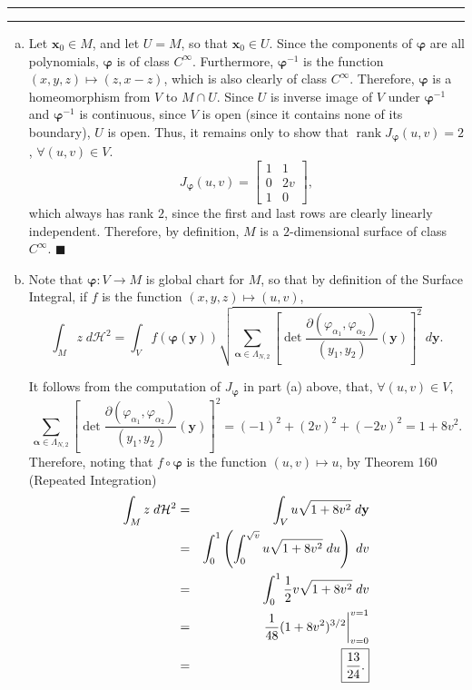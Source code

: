 \documentclass[11pt]{article}
\newcounter{questionCounter}
\newcounter{partCounter}[questionCounter]
\newenvironment{question}[2][\arabic{questionCounter}]{%
    \setcounter{partCounter}{0}%
    \vspace{.25in} \hrule \vspace{0.5em}%
        \noindent{\bf #2}%
    \vspace{0.8em} \hrule \vspace{.10in}%
    \addtocounter{questionCounter}{1}%
}{}
\renewcommand{\qed}{\quad $\blacksquare$}
\newcommand{\bvarphi}{\boldsymbol{\varphi}}
\newcommand{\balpha}{\boldsymbol{\alpha}}
\newcommand{\rank}{\operatorname{rank}}
\newcommand{\bx}{\mathbf{x}}
\newcommand{\by}{\mathbf{y}}
\begin{document}
\begin{question}{Problem 3}
\begin{enumerate}[(a)]
\item Let $\bx_0 \in M$, and let $U = M$, so that $\bx_0 \in U$.
Since the components of $\bvarphi$ are all polynomials, $\bvarphi$ is of class
$C^{\infty}$. Furthermore, $\bvarphi^{-1}$ is the function
$(x,y,z) \mapsto (z,x - z)$, which is also clearly of class $C^{\infty}$.
Therefore, $\bvarphi$ is a homeomorphism from $V$ to $M \cap U$. Since $U$ is
inverse image of $V$ under $\bvarphi^{-1}$ and $\bvarphi^{-1}$ is continuous,
since $V$ is open (since it contains none of its boundary), $U$ is open. Thus,
it remains only to show that $\rank J_{\bvarphi}(u,v) = 2$,
$\forall (u,v) \in V$.
\[J_{\bvarphi}(u,v) =
  \begin{bmatrix}
    1 & 1  \\
    0 & 2v \\
    1 & 0
  \end{bmatrix}
,\]
which always has rank $2$, since the first and last rows are clearly linearly
independent. Therefore, by definition, $M$ is a $2$-dimensional surface of
class $C^{\infty}$. \qed

\item Note that $\bvarphi:V \rightarrow M$ is global chart for $M$, so that by
definition of the Surface Integral, if $f$ is the function
$(x,y,z) \mapsto (u,v)$,
\[\int_M z \; d\mathcal{H}^2 = \int_V f(\bvarphi(\by))\sqrt{
    \sum_{\balpha \in \Lambda_{N,2}}
        \left[
            \det\frac{
                \partial(\varphi_{\alpha_1},\varphi_{\alpha_2})}
                {(y_1,y_2)}
            (\by)
        \right]^2
} \; d\by.\]

It follows from the computation of $J_{\bvarphi}$ in part (a) above, that,
$\forall (u,v) \in V$,
\[\sum_{\balpha \in \Lambda_{N,2}}
    \left[
        \det\frac{
            \partial(\varphi_{\alpha_1},\varphi_{\alpha_2})}
            {(y_1,y_2)}
        (\by)
    \right]^2
 = (-1)^2 + (2v)^2 + (-2v)^2 = 1 + 8v^2.\]
Therefore, noting that $f \circ \bvarphi$ is the function $(u,v) \mapsto u$,
by Theorem 160 (Repeated Integration)
\begin{eqnarray*}
\int_M z \; d\mathcal{H}^2
 & = & \int_V u\sqrt{1 + 8v^2} \; d\by \\
 & = & \int_0^1 \left(\int_0^{\sqrt{v}} u \sqrt{1 + 8v^2} \; du\right)\; dv \\
 & = & \int_0^1 \frac12 v\sqrt{1 + 8v^2} \; dv \\
 & = & \frac{1}{48}(1 + 8v^2)^{3/2} \bigg|_{v = 0}^{v = 1} \\
 & = & \mbox{\fbox{$\displaystyle \frac{13}{24}$.}}
\end{eqnarray*}
\end{enumerate}
\end{question}
\end{document}
